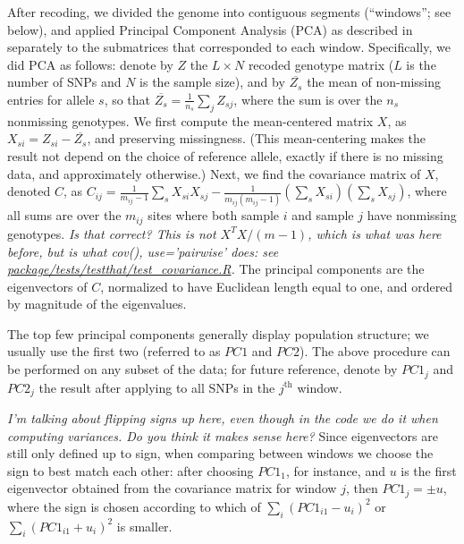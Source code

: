 \documentclass[11pt, oneside]{article}   	%
\newcommand{\plr}[1]{{\em \color{blue} #1}}
\newcommand{\pcone}{PC1}
\newcommand{\pctwo}{PC2}
\begin{document}
After recoding, we divided the genome into contiguous segments (``windows''; see below),
and applied Principal Component Analysis (PCA) as described in \citet{mcvean2009genealogical}
separately to the submatrices that corresponded to each window.
Specifically, we did PCA as follows:
denote by $Z$ the $L\times N$ recoded genotype matrix ($L$ is the number of SNPs and $N$ is the sample size), 
and by $\overline{Z_{s}}$ the mean of non-missing entries for allele $s$, 
so that $\overline{Z_{s}}=\frac{1}{n_s}\sum_j Z_{sj}$, 
where the sum is over the $n_s$ nonmissing genotypes.
We first compute the mean-centered matrix $X$, as $X_{si}=Z_{si}-\overline{Z_{s}}$,
and preserving missingness.
(This mean-centering makes the result not depend on the choice of reference allele,
exactly if there is no missing data, and approximately otherwise.)
Next, we find the covariance matrix of $X$, denoted $C$,
as $C_{ij} = \frac{1}{m_{ij}-1} \sum_s X_{si} X_{sj} - \frac{1}{m_{ij}(m_{ij}-1)} (\sum_s X_{si})(\sum_s X_{sj})$,
where all sums are over the $m_{ij}$ sites where both sample $i$ and sample $j$ have nonmissing genotypes.
\plr{Is that correct? This is not $X^T X/(m-1)$, which is what was here before, 
     but is what cov(), use='pairwise' does: see \url{package/tests/testthat/test_covariance.R}.}
The principal components are the eigenvectors of $C$, 
normalized to have Euclidean length equal to one,
and ordered by magnitude of the eigenvalues.

The top few principal components generally display population structure; 
we usually use the first two (referred to as $\pcone$ and $\pctwo$).
The above procedure can be performed on any subset of the data;
for future reference, denote by $\pcone_j$ and $\pctwo_j$
the result after applying to all SNPs in the $j^\text{th}$ window.

\plr{I'm talking about flipping signs up here, even though in the code we do it when computing variances. Do you think it makes sense here?}
Since eigenvectors are still only defined up to sign,
when comparing between windows we choose the sign to best match each other:
after choosing $\pcone_1$, for instance, and $u$ is the first eigenvector obtained from the covariance matrix
for window $j$,
then $\pcone_j = \pm u$,
where the sign is chosen according to which of 
$\sum_i (\pcone_{i1} - u_i)^{2}$ or
$\sum_i (\pcone_{i1} + u_i)^{2}$ 
is smaller.
\end{document}
